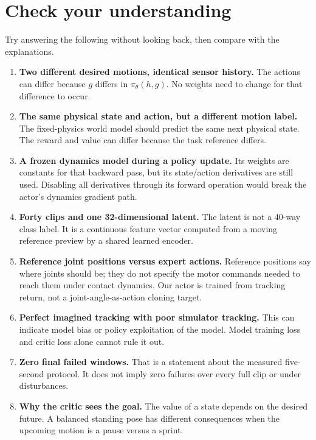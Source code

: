\documentclass[11pt,a4paper]{article}
\begin{document}
\section{Check your understanding}\label{sec:questions}
Try answering the following without looking back, then compare with the explanations.
\begin{enumerate}
\item \textbf{Two different desired motions, identical sensor history.}
The actions can differ because $g$ differs in $\pi_\theta(h,g)$. No weights need
to change for that difference to occur.
\item \textbf{The same physical state and action, but a different motion label.}
The fixed-physics world model should predict the same next physical state. The
reward and value can differ because the task reference differs.
\item \textbf{A frozen dynamics model during a policy update.}
Its weights are constants for that backward pass, but its state/action
derivatives are still used. Disabling all derivatives through its forward
operation would break the actor's dynamics gradient path.
\item \textbf{Forty clips and one 32-dimensional latent.}
The latent is not a 40-way class label. It is a continuous feature vector
computed from a moving reference preview by a shared learned encoder.
\item \textbf{Reference joint positions versus expert actions.}
Reference positions say where joints should be; they do not specify the motor
commands needed to reach them under contact dynamics. Our actor is trained from
tracking return, not a joint-angle-as-action cloning target.
\item \textbf{Perfect imagined tracking with poor simulator tracking.}
This can indicate model bias or policy exploitation of the model. Model
training loss and critic loss alone cannot rule it out.
\item \textbf{Zero final failed windows.}
That is a statement about the measured five-second protocol. It does not imply
zero failures over every full clip or under disturbances.
\item \textbf{Why the critic sees the goal.}
The value of a state depends on the desired future. A balanced standing pose
has different consequences when the upcoming motion is a pause versus a sprint.
\end{enumerate}

\appendix
\end{document}
